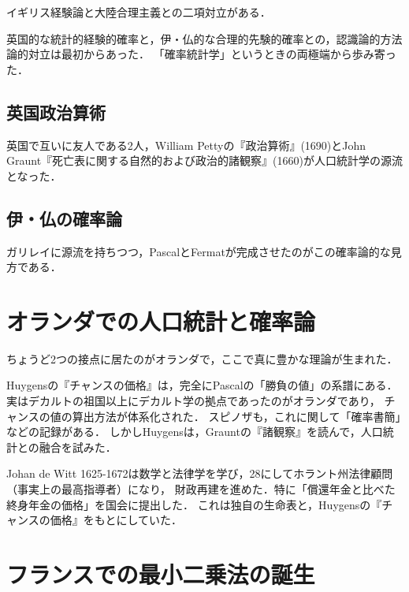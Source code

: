 \documentclass[uplatex,dvipdfmx]{jsreport}
\begin{document}
\begin{tcolorbox}[colframe=ForestGreen, colback=ForestGreen!10!white,breakable,colbacktitle=ForestGreen!40!white,coltitle=black,fonttitle=\bfseries\sffamily,
title=]
    イギリス経験論と大陸合理主義との二項対立がある．

    英国的な統計的経験的確率と，伊・仏的な合理的先験的確率との，認識論的方法論的対立は最初からあった．
    「確率統計学」というときの両極端から歩み寄った．
\end{tcolorbox}

\subsection{英国政治算術}

英国で互いに友人である2人，William Pettyの『政治算術』(1690)とJohn Graunt『死亡表に関する自然的および政治的諸観察』(1660)が人口統計学の源流となった．

\subsection{伊・仏の確率論}

ガリレイに源流を持ちつつ，PascalとFermatが完成させたのがこの確率論的な見方である．

\section{オランダでの人口統計と確率論}

\begin{tcolorbox}[colframe=ForestGreen, colback=ForestGreen!10!white,breakable,colbacktitle=ForestGreen!40!white,coltitle=black,fonttitle=\bfseries\sffamily,
title=]
    ちょうど2つの接点に居たのがオランダで，ここで真に豊かな理論が生まれた．
\end{tcolorbox}

Huygensの『チャンスの価格』は，完全にPascalの「勝負の値」の系譜にある．
実はデカルトの祖国以上にデカルト学の拠点であったのがオランダであり，
チャンスの値の算出方法が体系化された．
スピノザも，これに関して「確率書簡」などの記録がある．
しかしHuygensは，Grauntの『諸観察』を読んで，人口統計との融合を試みた．

Johan de Witt 1625-1672は数学と法律学を学び，28にしてホラント州法律顧問（事実上の最高指導者）になり，
財政再建を進めた．特に「償還年金と比べた終身年金の価格」を国会に提出した．
これは独自の生命表と，Huygensの『チャンスの価格』をもとにしていた．

\section{フランスでの最小二乗法の誕生}
\end{document}
